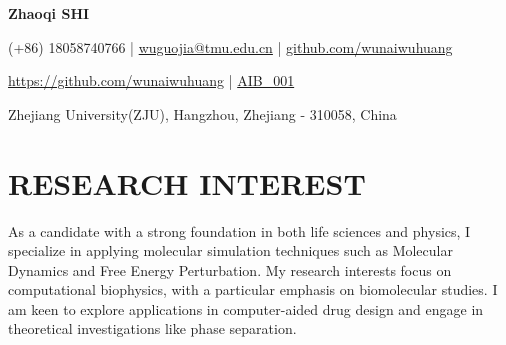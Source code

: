 \documentclass[a4paper,11pt]{article}
\newcommand{\socialicon}[1]{\raisebox{-0.05em}{\resizebox{!}{1em}{#1}}}
\newcommand{\headerfontiii}{\fontfamily{ppl}\selectfont} %
\begin{document}
\begin{justify}
\headerfontiii

\begin{center}
    {\Huge\textbf{Zhaoqi SHI}}
\end{center}
\vspace{-2mm}

\begin{center}
    \small{
    (+86) 18058740766 | \href{https://wuguojia@tmu.edu.cn}{wuguojia@tmu.edu.cn} | 
    \href{https://github.com/wunaiwuhuang}{github.com/wunaiwuhuang}
    }
\end{center}
\vspace{-8mm}

\begin{center}
    \small{
    \socialicon{\faGithub} \href{https://github.com/wunaiwuhuang}{https://github.com/wunaiwuhuang} | 
    \socialicon{\faTwitter} \href{https://x.com/AIB_001}{AIB\_001}
    }
\end{center}
\vspace{-7mm}
\begin{center}
    \small{Zhejiang University(ZJU), Hangzhou, Zhejiang - 310058, China}
\end{center}

\vspace{-4mm}

\section{\large{\textbf{RESEARCH INTEREST}}}
\vspace{1mm}
{
As a candidate with a strong foundation in both life sciences and physics, I specialize in applying molecular simulation techniques such as Molecular Dynamics and Free Energy Perturbation. My research interests focus on computational biophysics, with a particular emphasis on biomolecular studies. I am keen to explore applications in computer-aided drug design and engage in theoretical investigations like phase separation.
}
\vspace{-2mm}




\end{justify}
\end{document}
